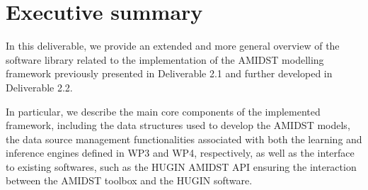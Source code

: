 \section{Executive summary}\label{section:executiveSummary}

In this deliverable, we provide an extended and more general overview of the software library related to the implementation of the AMIDST modelling framework previously presented in Deliverable 2.1 \cite{Deliverable2.1} and further developed in Deliverable 2.2. 

In particular, we describe the main core components of the implemented framework, including the data structures used to develop the AMIDST models, the data source management functionalities associated with both the learning and inference engines defined in WP3 and WP4, respectively, as well as the interface to existing softwares, such as the HUGIN AMIDST API ensuring the interaction between the AMIDST toolbox and the HUGIN software.

